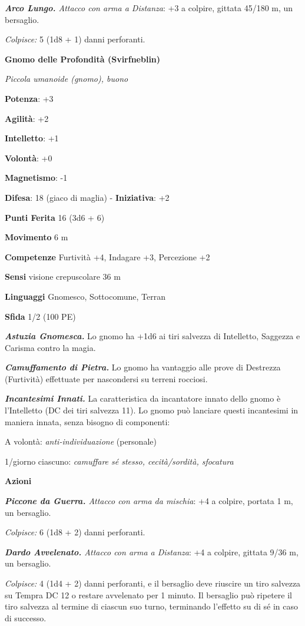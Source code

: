 \begin{multicols}{2}
\emph{\textbf{Arco Lungo.} Attacco con arma a Distanza}: +3 a colpire,
gittata 45/180 m, un bersaglio.

\emph{Colpisce:} 5 (1d8 + 1) danni perforanti.

\textbf{Gnomo delle Profondità (Svirfneblin)}

\emph{Piccola umanoide (gnomo), buono}

\textbf{Potenza}: +3

\textbf{Agilità}: +2

\textbf{Intelletto}: +1

\textbf{Volontà}: +0

\textbf{Magnetismo}: -1

\textbf{Difesa}: 18 (giaco di maglia) - \textbf{Iniziativa}: +2

\textbf{Punti Ferita} 16 (3d6 + 6)

\textbf{Movimento} 6 m

\textbf{Competenze} Furtività +4, Indagare +3, Percezione +2

\textbf{Sensi} visione crepuscolare 36 m

\textbf{Linguaggi} Gnomesco, Sottocomune, Terran

\textbf{Sfida} 1/2 (100 PE)\smallskip

\emph{\textbf{Astuzia Gnomesca.}} Lo gnomo ha +1d6 ai tiri salvezza
di Intelletto, Saggezza e Carisma contro la magia.

\emph{\textbf{Camuffamento di Pietra.}} Lo gnomo ha vantaggio alle prove
di Destrezza (Furtività) effettuate per nascondersi su terreni rocciosi.

\emph{\textbf{Incantesimi Innati.}} La caratteristica da incantatore
innato dello gnomo è l'Intelletto (DC dei tiri salvezza 11). Lo gnomo
può lanciare questi incantesimi in maniera innata, senza bisogno di
componenti:

A volontà: \emph{anti-individuazione} (personale)

1/giorno ciascuno: \emph{camuffare sé stesso, cecità/sordità, sfocatura}

\smallskip\textbf{Azioni}

\emph{\textbf{Piccone da Guerra.} Attacco con arma da mischia}: +4 a
colpire, portata 1 m, un bersaglio.

\emph{Colpisce:} 6 (1d8 + 2) danni perforanti.

\emph{\textbf{Dardo Avvelenato.} Attacco con arma a Distanza}: +4 a
colpire, gittata 9/36 m, un bersaglio.

\emph{Colpisce:} 4 (1d4 + 2) danni perforanti, e il bersaglio deve
riuscire un tiro salvezza su Tempra DC 12 o restare avvelenato per
1 minuto. Il bersaglio può ripetere il tiro salvezza al termine di
ciascun suo turno, terminando l'effetto su di sé in caso di successo.


\end{multicols}
